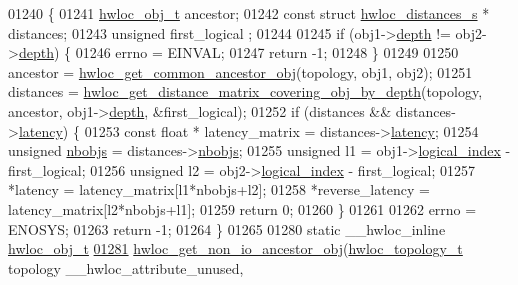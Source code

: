 \begin{DoxyCode}
01240 \{
01241   \hyperlink{a00016}{hwloc_obj_t} ancestor;
01242   \textcolor{keyword}{const} \textcolor{keyword}{struct }\hyperlink{a00014}{hwloc_distances_s} * distances;
01243   \textcolor{keywordtype}{unsigned} first\_logical ;
01244 
01245   \textcolor{keywordflow}{if} (obj1->\hyperlink{a00016_a9d82690370275d42d652eccdea5d3ee5}{depth} != obj2->\hyperlink{a00016_a9d82690370275d42d652eccdea5d3ee5}{depth}) \{
01246     errno = EINVAL;
01247     \textcolor{keywordflow}{return} -1;
01248   \}
01249 
01250   ancestor = \hyperlink{a00053_ga52a334f17c6b5b409d5cc6bb4ab8a2ab}{hwloc_get_common_ancestor_obj}(topology, obj1, obj2);
01251   distances = \hyperlink{a00063_ga186ac2711b98a12cf46d58cd005fbb51}{hwloc_get_distance_matrix_covering_obj_by_depth}(topology, ancestor,
       obj1->\hyperlink{a00016_a9d82690370275d42d652eccdea5d3ee5}{depth}, &first\_logical);
01252   \textcolor{keywordflow}{if} (distances && distances->\hyperlink{a00014_a0f70f48d1bfb18e5e2008825da2967c9}{latency}) \{
01253     \textcolor{keyword}{const} \textcolor{keywordtype}{float} * latency\_matrix = distances->\hyperlink{a00014_a0f70f48d1bfb18e5e2008825da2967c9}{latency};
01254     \textcolor{keywordtype}{unsigned} \hyperlink{a00014_a4ca2af858cebbce7324ec49903d09474}{nbobjs} = distances->\hyperlink{a00014_a4ca2af858cebbce7324ec49903d09474}{nbobjs};
01255     \textcolor{keywordtype}{unsigned} l1 = obj1->\hyperlink{a00016_a0d07fb7b8935e137c94d75a3eb492ae9}{logical_index} - first\_logical;
01256     \textcolor{keywordtype}{unsigned} l2 = obj2->\hyperlink{a00016_a0d07fb7b8935e137c94d75a3eb492ae9}{logical_index} - first\_logical;
01257     *latency = latency\_matrix[l1*nbobjs+l2];
01258     *reverse\_latency = latency\_matrix[l2*nbobjs+l1];
01259     \textcolor{keywordflow}{return} 0;
01260   \}
01261 
01262   errno = ENOSYS;
01263   \textcolor{keywordflow}{return} -1;
01264 \}
01265 
01280 \textcolor{keyword}{static} \_\_hwloc\_inline \hyperlink{a00016}{hwloc_obj_t}
\hypertarget{a00031_source_l01281}{}\hyperlink{a00064_ga3603275746a8792e54415d79763aa9e9}{01281} \hyperlink{a00064_ga3603275746a8792e54415d79763aa9e9}{hwloc_get_non_io_ancestor_obj}(\hyperlink{a00039_ga9d1e76ee15a7dee158b786c30b6a6e38}{hwloc_topology_t} topology \_\_hwloc\_attribute\_unused,
      

\end{DoxyCode}
